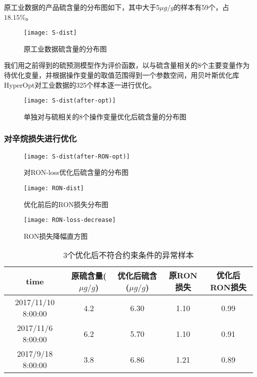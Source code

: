 \documentclass[bwprint]{gmcmthesis}
\begin{document}
原工业数据的产品硫含量的分布图如下，其中大于5$\mu g/g$的样本有59个，占 $18.15\%$。

\begin{figure}[htb]
	\centering
	\texttt{[image: S-dist]}
	\caption{原工业数据硫含量的分布图}
\end{figure}

我们用之前得到的硫预测模型作为评价函数，以与硫含量相关的8个主要变量作为待优化变量，并根据操作变量的取值范围得到一个参数空间，用贝叶斯优化库HyperOpt对工业数据的325个样本逐一进行优化。



\begin{figure}[htb]
	\centering
	\texttt{[image: S-dist(after-opt)]}
	\caption{单独对与硫相关的8个操作变量优化后硫含量的分布图}
\end{figure}




\FloatBarrier
\subsubsection{对辛烷损失进行优化}

\begin{figure}[htb]
	\centering
	\texttt{[image: S-dist(after-RON-opt)]}
	\caption{对RON-loss优化后硫含量的分布图}
\end{figure}

\begin{figure}[htb]
	\centering
	\texttt{[image: RON-dist]}
	\caption{优化前后的RON损失分布图}
\end{figure}




\begin{figure}[htb]
	\centering
	\texttt{[image: RON-loss-decrease]}
	\caption{RON损失降幅直方图}
\end{figure}

\begin{table}[htb]
	\caption{3个优化后不符合约束条件的异常样本}\label{tab:004} \centering
	\begin{tabular}{ccccc}
		\toprule[1.5pt]
	 time &  原硫含量($\mu g/g$) &  优化后硫含($\mu g/g$) &  原RON损失 &  优化后RON损失 \\
		\midrule[1pt]
2017/11/10 8:00:00 &              4.2 &               6.30 &    1.10 &      0.99 \\
2017/11/6 8:00:00 &              6.2 &               5.70 &    1.10 &      0.91 \\
2017/9/18 8:00:00 &              3.8 &               6.86 &    1.21 &      0.89 \\  
		\bottomrule[1.5pt]
	\end{tabular}
\end{table}
\end{document}
